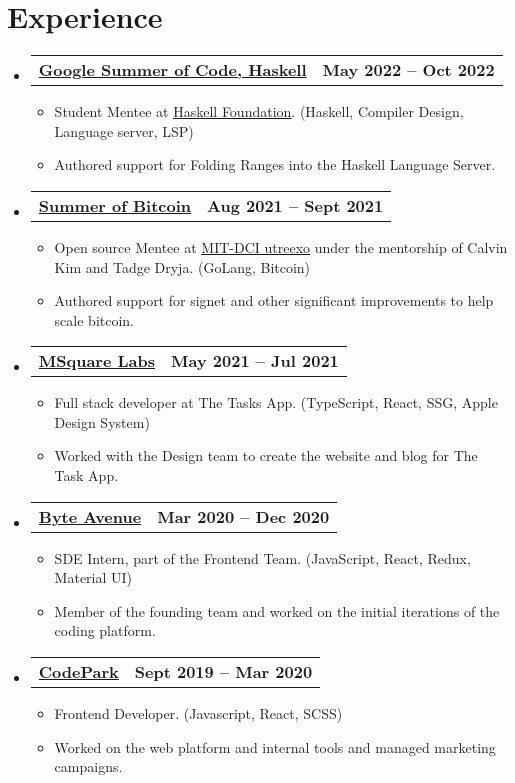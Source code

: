 \documentclass[a4paper,11pt]{article}
\makeatletter
\newcommand{\resumeItem}[1]{
  \item\small{
    {#1 \vspace{-2pt}}
  }
}
\newcommand{\resumeSubheadingg}[2]{
  \vspace{-2pt}\item
    \begin{tabular*}{1.0\textwidth}[t]{l@{\extracolsep{\fill}}r}
      \textbf{#1} & \textbf{\small #2} \\
    \end{tabular*}\vspace{-7pt}
}
\newcommand{\resumeSubHeadingListStart}{\begin{itemize}[leftmargin=0.0in, label={}]}
\newcommand{\resumeSubHeadingListEnd}{\end{itemize}}
\newcommand{\resumeItemListStart}{\begin{itemize}}
\newcommand{\resumeItemListEnd}{\end{itemize}\vspace{-5pt}}
\makeatother
\begin{document}
\section{Experience}
  \resumeSubHeadingListStart

 \resumeSubheadingg
      {\href{https://summerofcode.withgoogle.com/}{Google Summer of Code, Haskell}}{May 2022 -- Oct 2022}
      \resumeItemListStart
        \resumeItem{Student Mentee at \underline{\href{https://www.github.com/haskell}{Haskell Foundation}}. (Haskell, Compiler Design, Language server, LSP)}
        \resumeItem{Authored support for Folding Ranges into the Haskell Language Server.}
    \resumeItemListEnd

    \resumeSubheadingg
      {\href{https://www.summerofbitcoin.org/}{Summer of Bitcoin}}{Aug 2021 -- Sept 2021}
      \resumeItemListStart
        \resumeItem{Open source Mentee at \underline{\href{https://www.github.com/utreexo}{MIT-DCI utreexo}} under the mentorship of Calvin Kim and Tadge Dryja. (GoLang, Bitcoin)}
        \resumeItem{Authored support for signet and other significant improvements to help scale bitcoin.}
    \resumeItemListEnd

  \resumeSubheadingg
      {\href{https://twitter.com/thetaskapp}{MSquare Labs}}{May 2021 -- Jul 2021}
      \resumeItemListStart
        \resumeItem{Full stack developer at The Tasks App. (TypeScript, React, SSG, Apple Design System)}
        \resumeItem{Worked with the Design team to create the website and blog for The Task App.}
    \resumeItemListEnd

    \resumeSubheadingg
      {\href{https://byteavenue.org}{Byte Avenue}}{Mar 2020 -- Dec 2020}
      \resumeItemListStart
        \resumeItem{SDE Intern, part of the Frontend Team. (JavaScript, React, Redux, Material UI)}
        \resumeItem{Member of the founding team and worked on the initial iterations of the coding platform.}
    \resumeItemListEnd
    
    \resumeSubheadingg
      {\href{https://byteavenue.org}{CodePark}}{Sept 2019 -- Mar 2020}
      \resumeItemListStart
        \resumeItem{Frontend Developer. (Javascript, React, SCSS)}
        \resumeItem{Worked on the web platform and internal tools and managed marketing campaigns.}
    \resumeItemListEnd
    
  \resumeSubHeadingListEnd
\vspace{-16pt}
\end{document}
